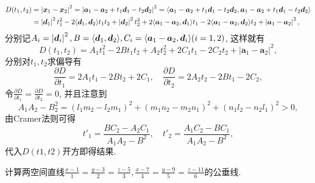 \begin{quiza}
\begin{solution}
\[\begin{split}
D(t_1,t_2)&=\left|\boldsymbol{x}_1-\boldsymbol{x}_2\right|^2=\left|\boldsymbol{a}_1-\boldsymbol{a}_2+t_1\boldsymbol{d}_1-t_2\boldsymbol{d}_2\right|^2=\langle \boldsymbol{a}_1-\boldsymbol{a}_2+t_1\boldsymbol{d}_1-t_2\boldsymbol{d}_2,\boldsymbol{a}_1-\boldsymbol{a}_2+t_1\boldsymbol{d}_1-t_2\boldsymbol{d}_2 \rangle\\&=\left|\boldsymbol{d}_1\right|^2t_1^2-2\langle \boldsymbol{d}_1,\boldsymbol{d}_2 \rangle t_1t_2+\left|\boldsymbol{d}_2\right|^2t_2^2+2\langle \boldsymbol{a}_1-\boldsymbol{a}_2,\boldsymbol{d}_1 \rangle t_1-2\langle \boldsymbol{a}_1-\boldsymbol{a}_2,\boldsymbol{d}_2 \rangle t_2+\left|\boldsymbol{a}_1-\boldsymbol{a}_2\right|^2,
\end{split}\]
分别记\(A_i=\left|\boldsymbol{d}_i\right|^2,B=\langle \boldsymbol{d}_1,\boldsymbol{d}_2 \rangle,C_i=\langle \boldsymbol{a}_1-\boldsymbol{a}_2,\boldsymbol{d}_i \rangle(i=1,2)\), 这样就有\[D(t_1,t_2)=A_1t_1^2-2Bt_1t_2+A_2t_2^2+2C_1t_1-2C_2t_2+\left|\boldsymbol{a}_1-\boldsymbol{a}_2\right|^2,\]
分别对\(t_1,t_2\)求偏导有\[\frac{\partial D}{\partial t_1}=2A_1t_1-2Bt_2+2C_1,\quad
\frac{\partial D}{\partial t_2}=2A_2t_2-2Bt_1-2C_2,\]
令\(\frac{\partial D}{\partial t_1}=\frac{\partial D}{\partial t_2}=0\), 并且注意到\[A_1A_2-B_2^2=(l_1m_2-l_2m_1)^2+(m_1n_2-m_2n_1)^2+(n_1l_2-n_2l_1)^2>0,\]
由Cramer法则可得\[t'_1=\frac{BC_2-A_2C_1}{A_1A_2-B^2},\quad t'_2=\frac{A_1C_2-BC_1}{A_1A_2-B^2},\]
代入\(D(t1,t2)\)开方即得结果.
\end{solution}
\woe 计算两空间直线\(\frac{x-1}{1}=\frac{y-3}{2}=\frac{z-5}{3},\frac{x-7}{4}=\frac{y-9}{5}=\frac{z-11}{6}\)的公垂线.
\begin{solution}


\end{solution}
\end{quiza}
